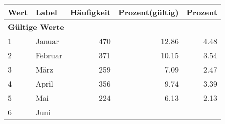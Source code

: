      \begin{longtable}{lXrrr}
     \toprule
     \textbf{Wert} & \textbf{Label} & \textbf{Häufigkeit} & \textbf{Prozent(gültig)} & \textbf{Prozent} \\
     \endhead
     \midrule
     \multicolumn{5}{l}{\textbf{Gültige Werte}}\\

     1 &
     \multicolumn{1}{X}{ Januar   } &


       \num{470} &
       \num[round-mode=places,round-precision=2]{12,86} &
         \num[round-mode=places,round-precision=2]{4,48} \\

     2 &
     \multicolumn{1}{X}{ Februar   } &


       \num{371} &
       \num[round-mode=places,round-precision=2]{10,15} &
         \num[round-mode=places,round-precision=2]{3,54} \\

     3 &
     \multicolumn{1}{X}{ März   } &


       \num{259} &
       \num[round-mode=places,round-precision=2]{7,09} &
         \num[round-mode=places,round-precision=2]{2,47} \\

     4 &
     \multicolumn{1}{X}{ April   } &


       \num{356} &
       \num[round-mode=places,round-precision=2]{9,74} &
         \num[round-mode=places,round-precision=2]{3,39} \\

     5 &
     \multicolumn{1}{X}{ Mai   } &


       \num{224} &
       \num[round-mode=places,round-precision=2]{6,13} &
         \num[round-mode=places,round-precision=2]{2,13} \\

     6 &
     \multicolumn{1}{X}{ Juni   } &



\end{longtable}
